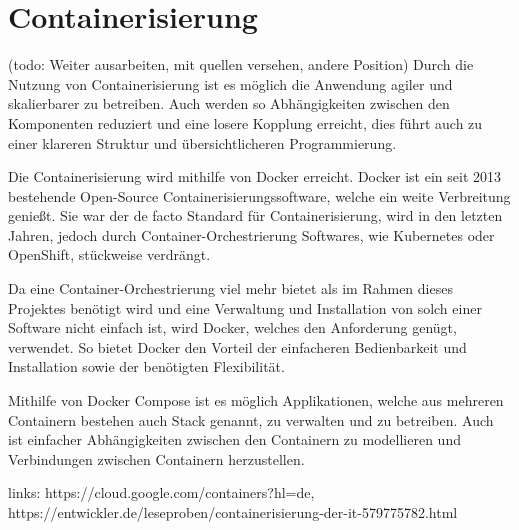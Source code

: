 \section{Containerisierung} \label{sec:Containerisierung}
(todo: Weiter ausarbeiten, mit quellen versehen, andere Position)
Durch die Nutzung von Containerisierung ist es möglich die Anwendung agiler und skalierbarer zu betreiben. Auch werden so Abhängigkeiten zwischen den Komponenten reduziert und eine losere Kopplung erreicht, dies führt auch zu einer klareren Struktur und übersichtlicheren Programmierung.

Die Containerisierung wird mithilfe von Docker erreicht. Docker ist ein seit 2013 bestehende Open-Source Containerisierungssoftware, welche ein weite Verbreitung genießt. Sie war der de facto Standard für Containerisierung, wird in den letzten Jahren, jedoch durch Container-Orchestrierung Softwares, wie Kubernetes oder OpenShift, stückweise verdrängt.

Da eine Container-Orchestrierung viel mehr bietet als im Rahmen dieses Projektes benötigt wird und eine Verwaltung und Installation von solch einer Software nicht einfach ist, wird Docker, welches den Anforderung genügt, verwendet. So bietet Docker den Vorteil der einfacheren Bedienbarkeit und Installation sowie der benötigten Flexibilität.

Mithilfe von Docker Compose ist es möglich Applikationen, welche aus mehreren Containern bestehen auch Stack genannt, zu verwalten und zu betreiben.
Auch ist einfacher Abhängigkeiten zwischen den Containern zu modellieren und Verbindungen zwischen Containern herzustellen.

links: https://cloud.google.com/containers?hl=de, https://entwickler.de/leseproben/containerisierung-der-it-579775782.html